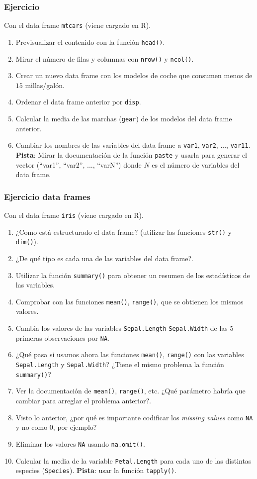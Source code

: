 \documentclass{beamer}
\begin{document}
\begin{frame}
\frametitle{Ejercicio}

Con el data frame \texttt{mtcars} (viene cargado en R).
\begin{enumerate}
\item Previsualizar el contenido con la función \texttt{head()}.
\item Mirar el número de filas y columnas con \texttt{nrow()} y \texttt{ncol()}.
\item Crear un nuevo data frame con los modelos de coche que consumen menos de $15$ millas/galón.
\item Ordenar el data frame anterior por \texttt{disp}.
\item Calcular la media de las marchas (\texttt{gear}) de los modelos del data frame anterior.
\item Cambiar los nombres de las variables del data frame a \texttt{var1}, \texttt{var2}, ..., \texttt{var11}.\\
\textbf{Pista}: Mirar la documentación de la función \texttt{paste} y usarla para generar el vector (``var1'', ``var2'', ..., ``varN'') donde $N$ es el número de variables del data frame.
\end{enumerate}
\end{frame}

\begin{frame}[allowframebreaks]
\frametitle{Ejercicio data frames}

Con el data frame \texttt{iris} (viene cargado en R).
\begin{enumerate}
\item ¿Como está estructurado el data frame? (utilizar las funciones \texttt{str()} y \texttt{dim()}).
\item ¿De qué tipo es cada una de las variables del data frame?.
\item Utilizar la función \texttt{summary()} para obtener un resumen de los estadísticos de las variables.
\item Comprobar con las funciones \texttt{mean()}, \texttt{range()}, que se obtienen los mismos valores.
\item Cambia los valores de las variables \texttt{Sepal.Length} \texttt{Sepal.Width} de las 5 primeras observaciones por \texttt{NA}.
\item ¿Qué pasa si usamos ahora las funciones \texttt{mean()},  \texttt{range()} con las variables \texttt{Sepal.Length} y \texttt{Sepal.Width}? ¿Tiene el mismo problema la función \texttt{summary()}?
\item Ver la documentación de \texttt{mean()}, \texttt{range()}, etc. ¿Qué parámetro habría que cambiar para arreglar el problema anterior?.
\item Visto lo anterior, ¿por qué es importante codificar los \textit{missing values} como \texttt{NA} y no como $0$, por ejemplo?
\item Eliminar los valores \texttt{NA} usando \texttt{na.omit()}.
\item Calcular la media de la variable \texttt{Petal.Length} para cada uno de las distintas especies (\texttt{Species}). \textbf{Pista}: usar la función \texttt{tapply()}.
\end{enumerate}
\end{frame}
\end{document}

